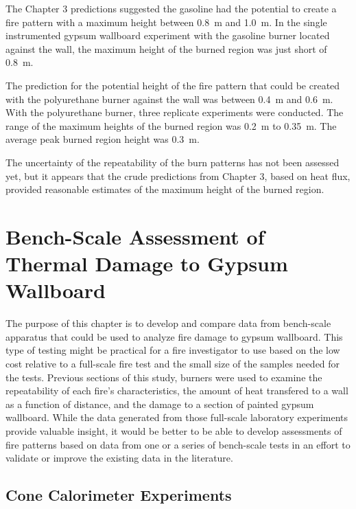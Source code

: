 \documentclass[twoside]{uocthesis}
\begin{document}
{The Chapter 3 predictions suggested the gasoline had the potential to create a fire pattern with a maximum height between 0.8~m and 1.0~m.  In the single instrumented gypsum wallboard experiment with the gasoline burner located against the wall, the maximum height of the burned region was just short of 0.8~m.  

The prediction for the potential height of the fire pattern that could be created with the polyurethane burner against the wall was between 0.4~m and 0.6~m.  With the polyurethane burner, three replicate experiments were conducted.  The range of the maximum heights of the burned region was 0.2~m to 0.35~m.  The average peak burned region height was 0.3~m. 

The uncertainty of the repeatability of the burn patterns has not been assessed yet, but it appears that the crude predictions from Chapter 3, based on heat flux, provided reasonable estimates of the maximum height of the burned region.      


\chapter{Bench-Scale Assessment of Thermal Damage to Gypsum Wallboard}

The purpose of this chapter is to develop and compare data from bench-scale apparatus that could be used to analyze fire damage to gypsum wallboard.
This type of testing might be practical for a fire investigator to use based on the low cost relative to a full-scale fire test and the small size of the samples needed for the tests.  Previous sections of this study, burners were used to examine the repeatability of each fire's characteristics, the amount of heat transfered to a wall as a function of distance, and the damage to a section of painted gypsum wallboard.  While the data generated from those full-scale laboratory experiments provide valuable insight, it would be better to be able to develop assessments of fire patterns based on data from one or a series of bench-scale tests in an effort to validate or improve the existing data in the literature.       


\section{Cone Calorimeter Experiments}

}
\end{document}
